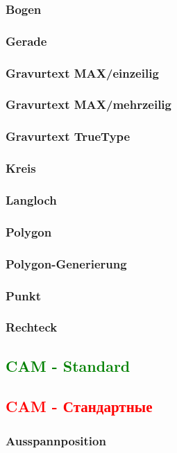\documentclass[14pt,a4paper]{book}
\newcommand{\DE}[1]{\textcolor{green}{#1}}
\newcommand{\RU}[1]{\textcolor{red}{#1}}
\begin{document}
			\subsubsection{Bogen} 
			\subsubsection{Gerade}
			\subsubsection{Gravurtext MAX/einzeilig} 
			\subsubsection{Gravurtext MAX/mehrzeilig}
			\subsubsection{Gravurtext TrueType} 
			\subsubsection{Kreis} 
			\subsubsection{Langloch} 
			\subsubsection{Polygon} 
			\subsubsection{Polygon-Generierung} 
			\subsubsection{Punkt} 
			\subsubsection{Rechteck} 
		\DE{\subsection{CAM - Standard}}
		\RU{\subsection{CAM - Стандартные}}
			\subsubsection{Ausspannposition} 
\end{document}
